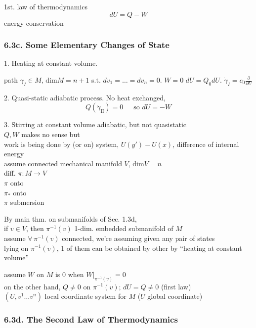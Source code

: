 1st. law of thermodynamics 
\[
dU = Q-W
\]
energy conservation 

\subsubsection*{6.3c. Some Elementary Changes of State}

1. Heating at constant volume. 

\phantom{\quad \, } path $\gamma_I \in M$, $\text{dim}M = n+1$ s.t. $dv_1 = \dots = dv_n =0$.  $W=0$
\phantom{\quad \, } $dU = Q_0 dU$.  $\dot{\gamma}_I = c_0 \frac{\partial}{ \partial U}$

2. Quasi-static adiabatic process.  No heat exchanged,
\[
Q(\dot{\gamma}_{\text{II}}) = 0 \quad \, \text{ so } dU = -W
\]

3. Stirring at constant volume adiabatic, but not quasistatic  \\
\phantom{\quad \, } $Q,W$ makes no sense but \\
\phantom{\quad \, } work is being done by (or on) system, $U(y') - U(x)$, difference of internal energy \\
assume connected mechanical manifold $V$, $\text{dim}V =n$ \\
\phantom{assume } diff. $\pi:M \to V$ \\
\phantom{assume diff} $\pi$ onto \\
\phantom{assume diff} $\pi_*$ onto \\
\phantom{assume diff} $\pi$ submersion

By main thm. on submanifolds of Sec. 1.3d, \\
\phantom{\quad \, } if $v\in V$, then $\pi^{-1}(v)$ 1-dim. embedded submanifold of $M$ \\
\phantom{\quad \quad \, } assume $\forall \, \pi^{-1}(v)$ connected, we're assuming given any pair of states \\
\phantom{\quad \quad \quad \, } lying on $\pi^{-1}(v)$, 1 of them can be obtained by other by ``heating at constant volume''

assume $W$ on $M$ is $0$ when $\left. W \right|_{\pi^{-1}(v)} =0$ \\
on the other hand, $Q \neq 0$ on $\pi^{-1}(v)$; $dU = Q \neq 0$ (first law) \\
\phantom{\quad \, } $(U,v^1 \dots v^n)$ local coordinate system for $M$ ($U$ global coordinate)

\subsubsection{6.3d. The Second Law of Thermodynamics} 

